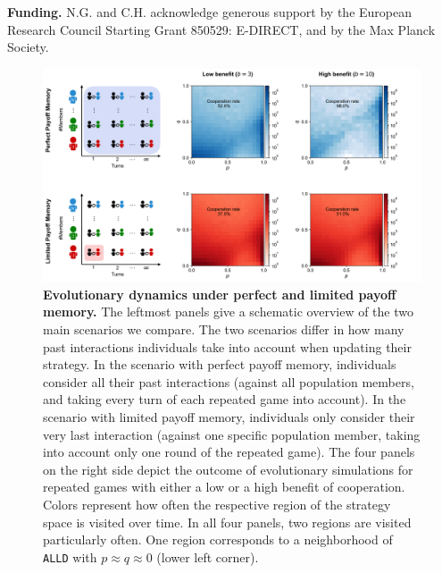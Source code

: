 \documentclass[11pt]{article}
\def\alld{\texttt{ALLD}}
\theoremstyle{plainCl1}
\theoremstyle{plainCl2}
\begin{document}
\noindent
{\bf Funding.}
N.G. and C.H. acknowledge generous support by the European Research Council Starting Grant 850529:
E-DIRECT, and by the Max Planck Society.\\




{
{\setlength{\bibsep}{0\baselineskip}


}




\clearpage
\newpage

\begin{figure}[t]
    \centering
    \includegraphics[width=\textwidth]{static/donation_expected_last_round_summary_results.pdf}
    \caption{{\bf Evolutionary dynamics under perfect and limited payoff memory.}
    The leftmost panels give a schematic overview of the two main scenarios we compare. 
    The two scenarios differ in how many past interactions individuals take into account when updating their strategy. 
    In the scenario with perfect payoff memory, individuals consider all their past interactions (against all population members, and taking every turn of each repeated game into account). 
    In the scenario with limited payoff memory, individuals only consider their very last interaction (against one specific population member, taking into account only one round of the repeated game). 
    The four panels  on the right side depict the outcome of evolutionary simulations for repeated games with either a low or a high benefit of cooperation. 
    Colors represent how often the respective region of the strategy space is visited over time. 
    In all four panels, two regions are visited particularly often. 
    One region corresponds to a neighborhood of \alld{} with $p\approx q\!\approx\!0$ (lower left corner). 
}
\end{figure}}
\end{document}
